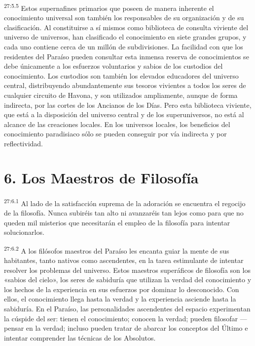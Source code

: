 \par
\textsuperscript{27:5.5} Estos supernafines primarios que poseen de manera inherente el conocimiento universal son también los responsables de su organización y de su clasificación. Al constituirse a sí mismos como biblioteca de consulta viviente del universo de universos, han clasificado el conocimiento en siete grandes grupos, y cada uno contiene cerca de un millón de subdivisiones. La facilidad con que los residentes del Paraíso pueden consultar esta inmensa reserva de conocimientos se debe únicamente a los esfuerzos voluntarios y sabios de los custodios del conocimiento. Los custodios son también los elevados educadores del universo central, distribuyendo abundantemente sus tesoros vivientes a todos los seres de cualquier circuito de Havona, y son utilizados ampliamente, aunque de forma indirecta, por las cortes de los Ancianos de los Días. Pero esta biblioteca viviente, que está a la disposición del universo central y de los superuniversos, no está al alcance de las creaciones locales. En los universos locales, los beneficios del conocimiento paradisiaco sólo se pueden conseguir por vía indirecta y por reflectividad.

\section*{6. Los Maestros de Filosofía}
\par
\textsuperscript{27:6.1} Al lado de la satisfacción suprema de la adoración se encuentra el regocijo de la filosofía. Nunca subiréis tan alto ni avanzaréis tan lejos como para que no queden mil misterios que necesitarán el empleo de la filosofía para intentar solucionarlos.

\par
\textsuperscript{27:6.2} A los filósofos maestros del Paraíso les encanta guiar la mente de sus habitantes, tanto nativos como ascendentes, en la tarea estimulante de intentar resolver los problemas del universo. Estos maestros superáficos de filosofía son los «sabios del cielo», los seres de sabiduría que utilizan la verdad del conocimiento y los hechos de la experiencia en sus esfuerzos por dominar lo desconocido. Con ellos, el conocimiento llega hasta la verdad y la experiencia asciende hasta la sabiduría. En el Paraíso, las personalidades ascendentes del espacio experimentan la cúspide del ser: tienen el conocimiento; conocen la verdad; pueden filosofar ---pensar en la verdad; incluso pueden tratar de abarcar los conceptos del Último e intentar comprender las técnicas de los Absolutos.

